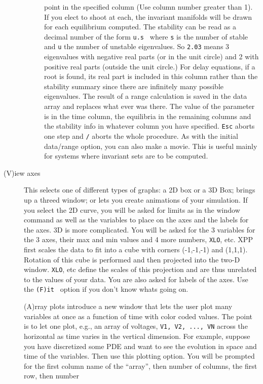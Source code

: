 \documentclass{article}
\newcommand{\tc}[1]{\addcontentsline{toc}{subsection}{#1}}
\begin{document}
\begin{description}
\begin{description}
point in the specified column (Use column number greater than 1).  
If you elect to shoot at each, the invariant 
manifolds will be drawn for each equilibrium computed.  The stability can be 
read as a decimal number of the form {\tt  u.s } where {\tt s}  is the
number of stable and {\tt u} 
 the number of unstable eigenvalues. So {\tt 2.03} means 3 eigenvalues
with negative real parts (or in the unit circle) and 2 with positive
real parts (outside the unit circle.)  
For delay equations, if a root is found, its real part is included in
this column rather than the stability summary since there are
infinitely many possible eigenvalues.
The result of a range calculation is saved 
in the data array and replaces what ever was there.  The value of the parameter
 is in the time column, the equilibria in the remaining columns and the 
stability info in whatever column you have specified. 
 {\tt Esc} aborts one step and 
{\tt /}  aborts the whole procedure. As with the initial data/range
option, you can also make a movie.  This is useful mainly for systems
where invariant sets are to be computed.
\end{description} 
\tc{Axes}\item[(V)iew axes]  This selects one of  different types of graphs: 
a 2D box or a 3D Box; brings up a threed window; or lets you create
animations of your simulation. 
If you select the 2D curve, you will be asked for limits 
as in the window command as well as the variables to place on the axes
and the labels for the axes.   
3D is more complicated.  You will be asked for the 3 variables for the 3 axes, 
their max and min values and 4 more numbers, {\tt XLO},  etc.  XPP first scales the 
data to fit into a cube with corners (-1,-1,-1) and (1,1,1).  Rotation of this
 cube is performed and then projected into the two-D window.  {\tt XLO}, etc define
 the scales of this projection and are thus unrelated to the values of your 
data.  You are also asked for labels of the axes.
Use the {\tt (F)it } option if you don't know whats going on.
\tc{Space-time plots} (A)rray plots introduce a new window that lets the user plot many
variables at once as a function of time with color coded values.  The
point is to let one plot, e.g., an array of voltages, {\tt V1, V2,
..., VN} across the horizontal as time varies in the vertical
dimension. For example, suppose you have discretized some PDE and want
to see the evolution in space and time of the variables.  Then use
this plotting option. You will be prompted for the first column name
of the ``array'', then number of columns, the first row, then number

\end{description}
\end{document}
